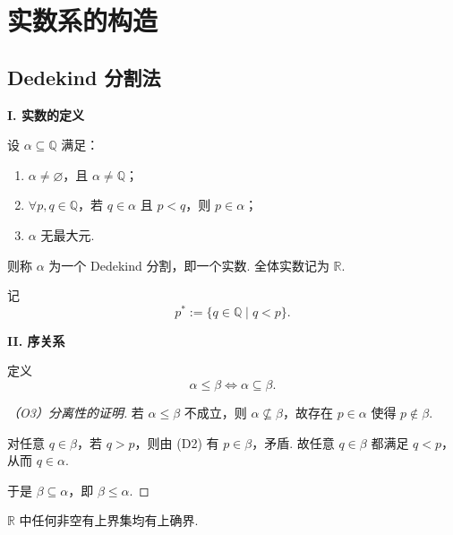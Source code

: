 \section{实数系的构造}


\subsection*{Dedekind 分割法}

\textbf{I. 实数的定义}

\begin{definition}[Dedekind 分割]
设 $\alpha \subseteq \mathbb{Q}$ 满足：
\begin{enumerate}
    \item[(D1)] $\alpha \ne \varnothing$，且 $\alpha \ne \mathbb{Q}$；
    \item[(D2)] $\forall p,q \in \mathbb{Q}$，若 $q \in \alpha$ 且 $p<q$，则 $p \in \alpha$；
    \item[(D3)] $\alpha$ 无最大元. 
\end{enumerate}
则称 $\alpha$ 为一个 Dedekind 分割，即一个实数. 全体实数记为 $\mathbb{R}$. 
\end{definition}



记
\[
p^*:=\{q \in \mathbb{Q} \mid q<p\}.
\]

\textbf{II. 序关系}

定义
\[
\alpha \le \beta \iff \alpha \subseteq \beta.
\]

\begin{proof}[（O3）分离性的证明]
若 $\alpha \le \beta$ 不成立，则 $\alpha \not\subseteq \beta$，故存在 $p \in \alpha$ 使得 $p \notin \beta$. 

对任意 $q \in \beta$，若 $q>p$，则由 (D2) 有 $p \in \beta$，矛盾. 
故任意 $q \in \beta$ 都满足 $q<p$，从而 $q \in \alpha$. 

于是 $\beta \subseteq \alpha$，即 $\beta \le \alpha$. 
\end{proof}

\begin{theorem}[上确界存在定理]
$\mathbb{R}$ 中任何非空有上界集均有上确界. 
\end{theorem}

